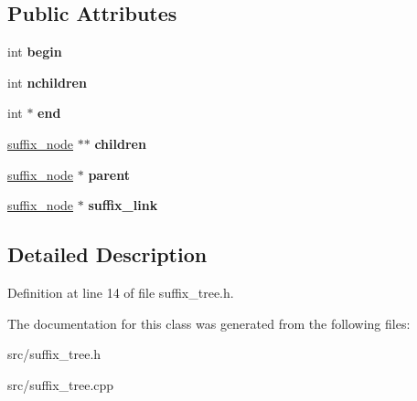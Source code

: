 \subsection*{Public Attributes}
\begin{DoxyCompactItemize}
\item 
\mbox{\label{classsuffix__node_a9de4356329d9fd07511bcc4ee080df50}} 
int {\bfseries begin}
\item 
\mbox{\label{classsuffix__node_a52e5a4ab12e08966e38db512ed6316dc}} 
int {\bfseries nchildren}
\item 
\mbox{\label{classsuffix__node_af3d0857764f653e1a0f622af5215a4a0}} 
int $\ast$ {\bfseries end}
\item 
\mbox{\label{classsuffix__node_ac60ca6423a4769832874c1a6efe3d1c1}} 
\mbox{\hyperlink{classsuffix__node}{suffix\+\_\+node}} $\ast$$\ast$ {\bfseries children}
\item 
\mbox{\label{classsuffix__node_a3034292aaf83597ce658f45438c89133}} 
\mbox{\hyperlink{classsuffix__node}{suffix\+\_\+node}} $\ast$ {\bfseries parent}
\item 
\mbox{\label{classsuffix__node_a7d19dcd69e8b91ecbde055f7c4d86048}} 
\mbox{\hyperlink{classsuffix__node}{suffix\+\_\+node}} $\ast$ {\bfseries suffix\+\_\+link}
\end{DoxyCompactItemize}


\subsection{Detailed Description}


Definition at line 14 of file suffix\+\_\+tree.\+h.



The documentation for this class was generated from the following files\+:\begin{DoxyCompactItemize}
\item 
src/suffix\+\_\+tree.\+h\item 
src/suffix\+\_\+tree.\+cpp\end{DoxyCompactItemize}
